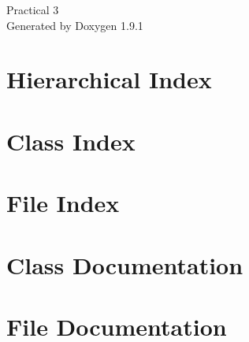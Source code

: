 \let\mypdfximage\pdfximage\def\pdfximage{\immediate\mypdfximage}\documentclass[twoside]{book}
\newcommand{\+}{\discretionary{\mbox{\scriptsize$\hookleftarrow$}}{}{}}
\newcommand{\clearemptydoublepage}{%
  \newpage{\pagestyle{empty}\cleardoublepage}%
}
\begin{document}
\raggedbottom

\hypersetup{pageanchor=false,
             bookmarksnumbered=true,
             pdfencoding=unicode
            }
\begin{titlepage}
\vspace*{7cm}
\begin{center}%
{\Large Practical 3 }\\
\vspace*{1cm}
{\large Generated by Doxygen 1.9.1}\\
\end{center}
\end{titlepage}
\clearemptydoublepage
{}
\tableofcontents
\clearemptydoublepage
{}
\hypersetup{pageanchor=true}

\chapter{Hierarchical Index}

\chapter{Class Index}

\chapter{File Index}

\chapter{Class Documentation}

















\chapter{File Documentation}























\backmatter
\newpage
{}
\clearemptydoublepage
{}
\printindex
\end{document}
